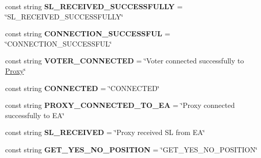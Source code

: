 \begin{DoxyCompactItemize}
\item 
\hypertarget{class_proxy_1_1_constants_ac099965c1b8a5723af5cbd977a6a8b87}{}const string {\bfseries S\+L\+\_\+\+R\+E\+C\+E\+I\+V\+E\+D\+\_\+\+S\+U\+C\+C\+E\+S\+S\+F\+U\+L\+L\+Y} = \char`\"{}S\+L\+\_\+\+R\+E\+C\+E\+I\+V\+E\+D\+\_\+\+S\+U\+C\+C\+E\+S\+S\+F\+U\+L\+L\+Y\char`\"{}\label{class_proxy_1_1_constants_ac099965c1b8a5723af5cbd977a6a8b87}

\item 
\hypertarget{class_proxy_1_1_constants_ab26982e3a5975aa850fa42ed6a54b570}{}const string {\bfseries C\+O\+N\+N\+E\+C\+T\+I\+O\+N\+\_\+\+S\+U\+C\+C\+E\+S\+S\+F\+U\+L} = \char`\"{}C\+O\+N\+N\+E\+C\+T\+I\+O\+N\+\_\+\+S\+U\+C\+C\+E\+S\+S\+F\+U\+L\char`\"{}\label{class_proxy_1_1_constants_ab26982e3a5975aa850fa42ed6a54b570}

\item 
\hypertarget{class_proxy_1_1_constants_acfec5924f56cf7bb5fb35e5b659cfa37}{}const string {\bfseries V\+O\+T\+E\+R\+\_\+\+C\+O\+N\+N\+E\+C\+T\+E\+D} = \char`\"{}Voter connected successfully to \hyperlink{class_proxy_1_1_proxy}{Proxy}\char`\"{}\label{class_proxy_1_1_constants_acfec5924f56cf7bb5fb35e5b659cfa37}

\item 
\hypertarget{class_proxy_1_1_constants_a067ab1574b4f93383359c17bf80b9782}{}const string {\bfseries C\+O\+N\+N\+E\+C\+T\+E\+D} = \char`\"{}C\+O\+N\+N\+E\+C\+T\+E\+D\char`\"{}\label{class_proxy_1_1_constants_a067ab1574b4f93383359c17bf80b9782}

\item 
\hypertarget{class_proxy_1_1_constants_a96bf8a37cb61a47062bced07bee66107}{}const string {\bfseries P\+R\+O\+X\+Y\+\_\+\+C\+O\+N\+N\+E\+C\+T\+E\+D\+\_\+\+T\+O\+\_\+\+E\+A} = \char`\"{}Proxy connected successfully to E\+A\char`\"{}\label{class_proxy_1_1_constants_a96bf8a37cb61a47062bced07bee66107}

\item 
\hypertarget{class_proxy_1_1_constants_ac6eb6ddec00fdb270cb7911992acabe4}{}const string {\bfseries S\+L\+\_\+\+R\+E\+C\+E\+I\+V\+E\+D} = \char`\"{}Proxy received S\+L from E\+A\char`\"{}\label{class_proxy_1_1_constants_ac6eb6ddec00fdb270cb7911992acabe4}

\item 
\hypertarget{class_proxy_1_1_constants_a52218b0a8b3ebe2ed81c49cf69031895}{}const string {\bfseries G\+E\+T\+\_\+\+Y\+E\+S\+\_\+\+N\+O\+\_\+\+P\+O\+S\+I\+T\+I\+O\+N} = \char`\"{}G\+E\+T\+\_\+\+Y\+E\+S\+\_\+\+N\+O\+\_\+\+P\+O\+S\+I\+T\+I\+O\+N\char`\"{}\label{class_proxy_1_1_constants_a52218b0a8b3ebe2ed81c49cf69031895}


\end{DoxyCompactItemize}
